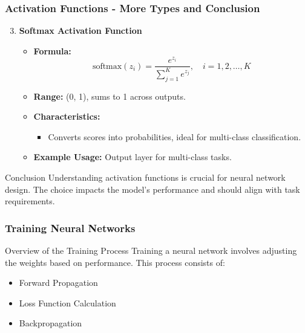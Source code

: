 \documentclass[aspectratio=169]{beamer}
\begin{document}
\begin{frame}[fragile]
    \frametitle{Activation Functions - More Types and Conclusion}
    \begin{enumerate}
        \setcounter{enumi}{2} %
        \item \textbf{Softmax Activation Function}
            \begin{itemize}
                \item \textbf{Formula:} 
                \begin{equation}
                    \text{softmax}(z_i) = \frac{e^{z_i}}{\sum_{j=1}^{K} e^{z_j}}, \quad i = 1, 2, \ldots, K
                \end{equation}
                \item \textbf{Range:} (0, 1), sums to 1 across outputs.
                \item \textbf{Characteristics:}
                \begin{itemize}
                    \item Converts scores into probabilities, ideal for multi-class classification.
                \end{itemize}
                \item \textbf{Example Usage:} Output layer for multi-class tasks.
            \end{itemize}
    \end{enumerate}
    \begin{block}{Conclusion}
        Understanding activation functions is crucial for neural network design. The choice impacts the 
        model's performance and should align with task requirements.
    \end{block}
\end{frame}

\begin{frame}[fragile]
    \frametitle{Training Neural Networks}
    \begin{block}{Overview of the Training Process}
        Training a neural network involves adjusting the weights based on performance. This process consists of:
        \begin{itemize}
            \item Forward Propagation
            \item Loss Function Calculation
            \item Backpropagation
        \end{itemize}
    \end{block}
\end{frame}
\end{document}
